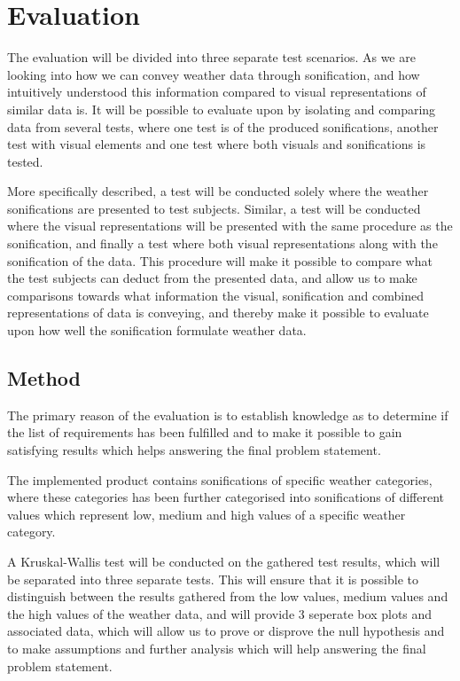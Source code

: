 
\section{Evaluation} %
\label{sec:evaluation}

The evaluation will be divided into three separate test scenarios. 
As we are looking into how we can convey weather data through sonification, and how intuitively understood this information compared to visual representations of similar data is. 
It will be possible to evaluate upon by isolating and comparing data from several tests, where one test is of the produced sonifications, another test with visual elements and one test where both visuals and sonifications is tested.


More specifically described, a test will be conducted solely where the weather sonifications are presented to test subjects.
Similar, a test will be conducted where the visual representations will be presented with the same procedure as the sonification, and finally a test where both visual representations along with the sonification of the data.
This procedure will make it possible to compare what the test subjects can deduct from the presented data, and allow us to make comparisons towards what information the visual, sonification and combined representations of data is conveying, and thereby make it possible to evaluate upon how well the sonification formulate weather data.


\subsection{Method} %
\label{sub:method}

The primary reason of the evaluation is to establish knowledge as to determine if the list of requirements has been fulfilled and to make it possible to gain satisfying results which helps answering the final problem statement.


The implemented product contains sonifications of specific weather categories, where these categories has been further categorised into sonifications of different values which represent low, medium and high values of a specific weather category.

A Kruskal-Wallis test will be conducted on the gathered test results, which will be separated into three separate tests. 
This will ensure that it is possible to distinguish between the results gathered from the low values, medium values and the high values of the weather data, and will provide 3 seperate box plots and associated data, which will allow us to prove or disprove the null hypothesis and to make assumptions and further analysis which will help answering the final problem statement.


